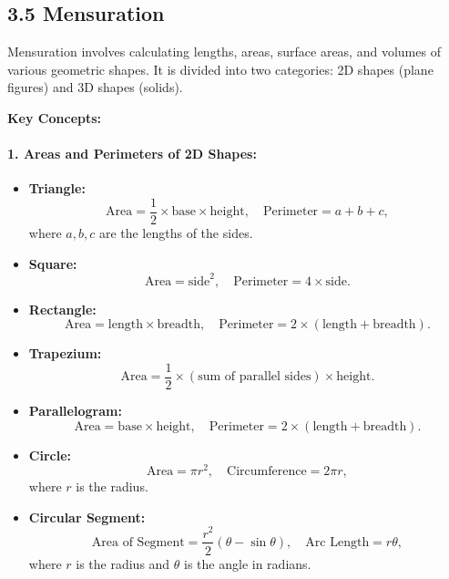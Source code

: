 
\subsection*{3.5 Mensuration}
Mensuration involves calculating lengths, areas, surface areas, and volumes of various geometric shapes. It is divided into two categories: 2D shapes (plane figures) and 3D shapes (solids).

\textbf{Key Concepts:}

\paragraph{1. Areas and Perimeters of 2D Shapes:}
\begin{itemize}
	\item \textbf{Triangle:}
	\[
	\text{Area} = \frac{1}{2} \times \text{base} \times \text{height}, \quad \text{Perimeter} = a + b + c,
	\]
	where $a, b, c$ are the lengths of the sides.
	\item \textbf{Square:}
	\[
	\text{Area} = \text{side}^2, \quad \text{Perimeter} = 4 \times \text{side}.
	\]
	\item \textbf{Rectangle:}
	\[
	\text{Area} = \text{length} \times \text{breadth}, \quad \text{Perimeter} = 2 \times (\text{length} + \text{breadth}).
	\]
	\item \textbf{Trapezium:}
	\[
	\text{Area} = \frac{1}{2} \times (\text{sum of parallel sides}) \times \text{height}.
	\]
	\item \textbf{Parallelogram:}
	\[
	\text{Area} = \text{base} \times \text{height}, \quad \text{Perimeter} = 2 \times (\text{length} + \text{breadth}).
	\]
	\item \textbf{Circle:}
	\[
	\text{Area} = \pi r^2, \quad \text{Circumference} = 2\pi r,
	\]
	where $r$ is the radius.
	\item \textbf{Circular Segment:}
	\[
	\text{Area of Segment} = \frac{r^2}{2}(\theta - \sin\theta), \quad \text{Arc Length} = r\theta,
	\]
	where $r$ is the radius and $\theta$ is the angle in radians.
\end{itemize}

